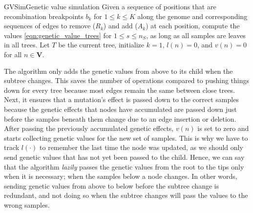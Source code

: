 \begin{taocpalg}{GVSim}{Genetic value simulation}
{
    Given a sequence of positions that are recombination breakpoints $b_k$ for $1 \le k \le K$ %
    along the genome and corresponding sequences of edges to remove ($R_k$) and add ($A_k$) at each position,
    compute the values
    \eqref{eqn:genetic_value_trees} for $1 \le s \le n_S$, as long as all samples are leaves in all trees.
    Let $T$ be the current tree,
    initialize $k = 1$, $l(n)=0$, and $v(n) = 0$ for all $n \in \mathbf{V}$.
}




\end{taocpalg}

The algorithm only adds the genetic values from above to its child when the subtree changes.
%
This saves the number of operations compared to pushing things down for every tree
because most edges remain the same between close trees.
%
Next, it ensures that a mutation's effect is passed down to the correct samples
because the genetic effects that nodes have accumulated
are passed down just before the samples beneath them change due to an edge insertion or deletion.
%
After passing the previously accumulated genetic effects,
$v(n)$ is set to zero and starts collecting genetic values for the new set of samples.
%
This is why we have to track $l(\cdot)$ to remember the last time the node was updated,
as we should only send genetic values that has not yet been passed to the child.
%
Hence, we can say that the algorithm \textit{lazily} passes
the genetic values from the root to the tips only when it is necessary;
when the samples below a node changes.
%
In other words, sending genetic values from above to below before the subtree change is redundant,
and not doing so when the subtree changes will pass the values to the wrong samples.

